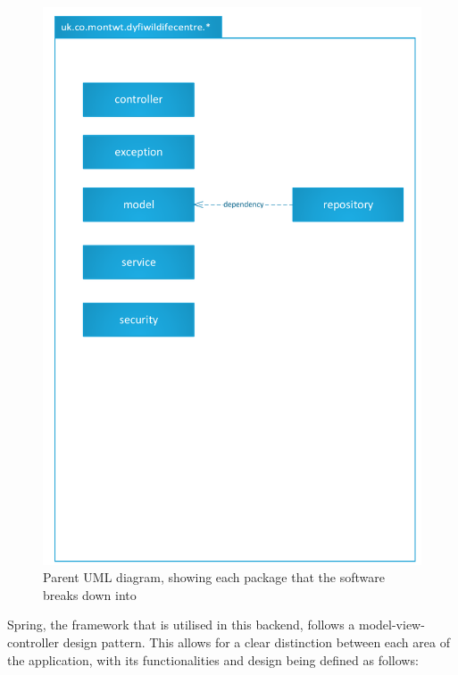 \begin{figure}[!ht]
	\includegraphics[scale=0.5]{diagrams/parent_uml}
	\caption{Parent UML diagram, showing each package that the software breaks down into}
\end{figure}	

Spring, the framework that is utilised in this backend, follows a model-view-controller design pattern. This allows for a clear distinction between each area of the application, with its functionalities and design being defined as follows:

